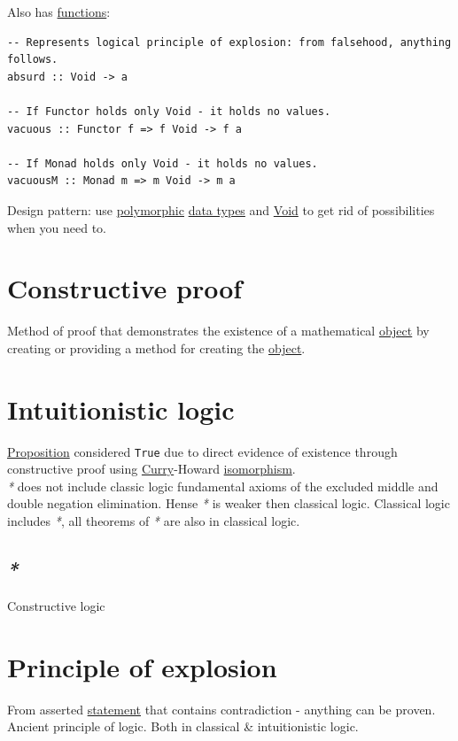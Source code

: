 \documentclass[a4paper,14pt,oneside]{book}
\begin{document}
Also has \hyperref[org0bd6046]{functions}:\\
\begin{verbatim}
-- Represents logical principle of explosion: from falsehood, anything follows.
absurd :: Void -> a

-- If Functor holds only Void - it holds no values.
vacuous :: Functor f => f Void -> f a

-- If Monad holds only Void - it holds no values.
vacuousM :: Monad m => m Void -> m a
\end{verbatim}

Design pattern: use \hyperref[org0255a02]{polymorphic} \hyperref[org6ad0f56]{data types} and \hyperref[org2bd057a]{Void} to get rid of possibilities when you need to.\\

\chapter{Constructive proof}
\label{sec:org8d2a46b}

Method of proof that demonstrates the existence of a mathematical \hyperref[org5771609]{object} by creating or providing a method for creating the \hyperref[org5771609]{object}.\\

\chapter{Intuitionistic logic}
\label{sec:orgaba3ab4}

\hyperref[org19a0c89]{Proposition} considered \texttt{True} due to direct evidence of existence through constructive proof using \hyperref[org242f017]{Curry}-Howard \hyperref[org1fa9882]{isomorphism}.\\

\emph{*} does not include classic logic fundamental axioms of the excluded middle and double negation elimination. Hense \emph{*} is weaker then classical logic. Classical logic includes \emph{*}, all theorems of \emph{*} are also in classical logic.\\

\section{\emph{*}}
\label{sec:org45d7788}

\label{org8243bdc}Constructive logic\\

\chapter{\label{org4d3ca2b}Principle of explosion}
\label{sec:org1fd1f16}
From asserted \hyperref[org722f075]{statement} that contains contradiction - anything can be proven.\\
Ancient principle of logic. Both in classical \& intuitionistic logic.\\
\end{document}
